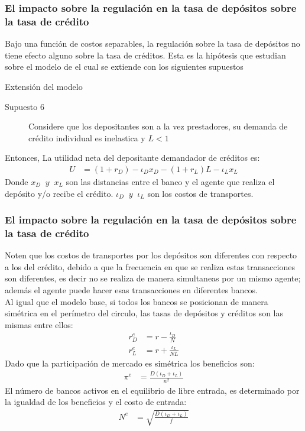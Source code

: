 \begin{frame}
    \frametitle{{\normalsize El impacto sobre la regulación en la tasa de depósitos sobre la tasa de crédito} {}}
    
    Bajo una función de costos separables, la regulación sobre la tasa de depósitos no tiene efecto alguno sobre la tasa de créditos. Esta es la hipótesis que estudian \cite{Chiappori1995} sobre el modelo de \cite{Salop1979} el cual se extiende con los siguientes supuestos
     \begin{block} {Extensión del modelo}
        \begin{description}
           \item[Supuesto 6]  Considere que los depositantes son a la vez prestadores, su demanda de crédito individual es inelastica y $L<1$ 
                      
        \end{description}
        
    \end{block}	
    Entonces, La utilidad neta del depositante demandador de créditos es:
    \begin{align}
    U&=(1+r_{D})-\iota_{D}x_{D}-(1+r_{L})L-\iota_{L}x_{L}
    \end{align} 
    Donde $x_{D}\;\;y\;\;x_{L}$ son las distancias entre el banco y el agente que realiza el depósito y/o recibe el crédito. $\iota_{D}\;\;y\;\;\iota_{L}$ son los costos de transportes.
     
\end{frame}



\begin{frame}
    \frametitle{{\normalsize El impacto sobre la regulación en la tasa de depósitos sobre la tasa de crédito} {}}
    {\footnotesize Noten que los costos de transportes por los depósitos son diferentes con respecto a los del crédito, debido a que la frecuencia en que se realiza estas transacciones son diferentes, es decir no se realiza de manera simultaneas por un mismo agente; además el agente puede hacer esas transacciones en diferentes bancos. \\
    Al igual que el modelo base, si todos los bancos se posicionan de manera simétrica en el perímetro del circulo, las tasas de depósitos y créditos son las mismas entre ellos:
      \begin{align}
      r_{D}^{e}&=r-\frac{\iota_{D}}{N} \\
      r_{L}^{e}&=r+\frac{\iota_{L}}{NL} 
      \end{align} 
    Dado que la participación de mercado es simétrica los beneficios son:
     \begin{align}
     \pi^{e}&=\frac{D(\iota_{D}+\iota_{L})}{n^{2}}
     \end{align} 
     El número de bancos activos en el equilibrio de libre entrada, es determinado por la igualdad de los beneficios y el costo de entrada:
     \begin{align}
     N^{e}&=\sqrt{\frac{D(\iota_{D}+\iota_{L})}{f}}
     \end{align} 
     }
     
\end{frame}



